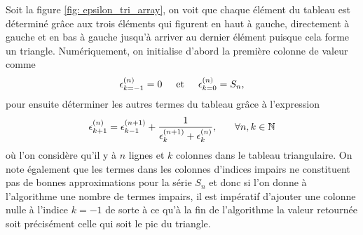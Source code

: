     Soit la figure \ref{fig: epsilon_tri_array}, on voit que chaque élément du tableau est déterminé grâce aux trois éléments qui figurent en haut à gauche, directement à gauche et en bas à gauche jusqu'à arriver au dernier élément puisque cela forme un triangle. Numériquement, on initialise d'abord la première colonne de valeur comme
    \begin{align*}
        \epsilon_{k=-1}^{(n)} = 0\hspace{0.5cm}\text{et}\hspace{0.5cm}\epsilon_{k=0}^{(n)} = S_n,
    \end{align*}
    pour ensuite déterminer les autres termes du tableau grâce à l'expression
    \begin{align*}
        \epsilon_{k + 1}^{(n)} = \epsilon_{k - 1}^{(n + 1)} + \frac{1}{\epsilon_{k}^{(n + 1)} + \epsilon_{k}^{(n)}},\hspace{0.5cm}\text{ }\forall n, k\in\mathbb{N}
    \end{align*}
    où l'on considère qu'il y à $n$ lignes et $k$ colonnes dans le tableau triangulaire. On note également que les termes dans les colonnes d'indices impairs ne constituent pas de bonnes approximations pour la série $S_n$ et donc si l'on donne à l'algorithme une nombre de termes impairs, il est impératif d'ajouter une colonne nulle à l'indice $k=-1$ de sorte à ce qu'à la fin de l'algorithme la valeur retournée soit précisément celle qui soit le pic du triangle.